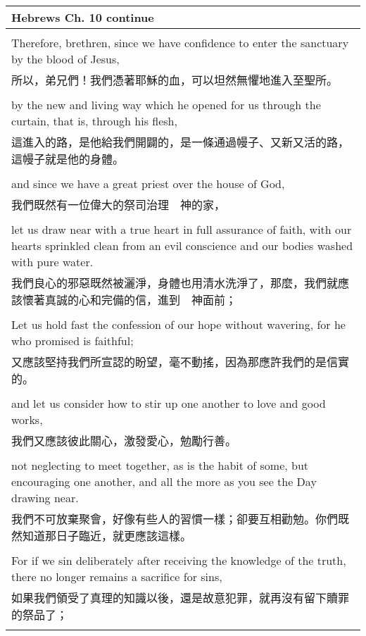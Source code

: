 \newpage

\begin{tabularx}{\textwidth}{p{}}
\hline
Hebrews Ch. 10 continue \\
\hline \\
Therefore, brethren, since we have confidence to enter the sanctuary by the blood of Jesus, \\
所以，弟兄們！我們憑著耶穌的血，可以坦然無懼地進入至聖所。 \\ \\
by the new and living way which he opened for us through the curtain, that is, through his flesh, \\
這進入的路，是他給我們開闢的，是一條通過幔子、又新又活的路，這幔子就是他的身體。 \\ \\
and since we have a great priest over the house of God, \\
我們既然有一位偉大的祭司治理　神的家， \\ \\
let us draw near with a true heart in full assurance of faith, with our hearts sprinkled clean from an evil conscience and our bodies washed with pure water. \\
我們良心的邪惡既然被灑淨，身體也用清水洗淨了，那麼，我們就應該懷著真誠的心和完備的信，進到　神面前； \\ \\
Let us hold fast the confession of our hope without wavering, for he who promised is faithful; \\
又應該堅持我們所宣認的盼望，毫不動搖，因為那應許我們的是信實的。 \\ \\
and let us consider how to stir up one another to love and good works, \\
我們又應該彼此關心，激發愛心，勉勵行善。 \\ \\
not neglecting to meet together, as is the habit of some, but encouraging one another, and all the more as you see the Day drawing near. \\
我們不可放棄聚會，好像有些人的習慣一樣；卻要互相勸勉。你們既然知道那日子臨近，就更應該這樣。 \\ \\
For if we sin deliberately after receiving the knowledge of the truth, there no longer remains a sacrifice for sins, \\
如果我們領受了真理的知識以後，還是故意犯罪，就再沒有留下贖罪的祭品了； \\ \\

\end{tabularx}
